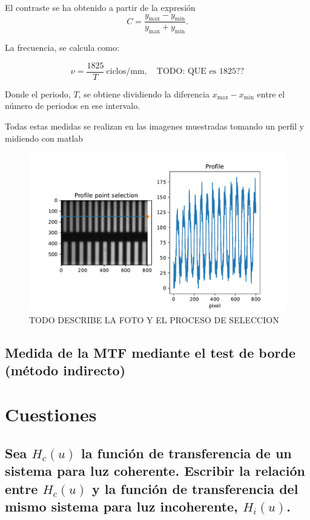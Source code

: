 \documentclass{./packages/optica-article}
\begin{document}
El contraste se ha obtenido a partir de la expresión
\nopagebreak
\begin{equation}
	C = \frac{y_{\max} - y_{\min}}{y_{\max} + y_{\min}}.
	\label{eq:contraste}
\end{equation}

La frecuencia, se calcula como:

\begin{equation}
	\nu = \frac{1825}{T}\ \textrm{ciclos/mm},\quad\textrm{TODO: QUE es 1825??}
	\label{eq:frecuencia}
\end{equation}

Donde el periodo, $T$, se obtiene dividiendo la diferencia $x_{\max} - x_{\min}$ entre el número de periodos en ese intervalo.

Todas estas medidas se realizan en las imagenes muestradas tomando un perfil y midiendo con matlab 

\begin{figure}[hptb]
\includegraphics[width=\textwidth]{profile-lines.pdf}
\caption{TODO DESCRIBE LA FOTO Y EL PROCESO DE SELECCION}
\label{fig:example}
\end{figure}

\subsection{Medida de la MTF mediante el test de borde (método indirecto)}

\section{Cuestiones}

\subsection{Sea $H_{c}(u)$ la función de transferencia de un sistema para luz coherente. Escribir la relación entre $H_{c}(u)$ y la función de transferencia del mismo sistema para luz incoherente, $H_{i}(u)$.}
\end{document}
